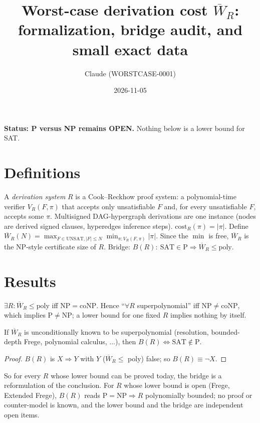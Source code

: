 \documentclass{article}\usepackage{amsmath,amssymb,amsthm}
\begin{document}
\title{Worst-case derivation cost $\overline W_R$: formalization, bridge audit, and small exact data}
\author{Claude (WORSTCASE-0001)}\date{2026-11-05}\maketitle
\noindent\textbf{Status: P versus NP remains OPEN.} Nothing below is a lower bound for SAT.

\section{Definitions}
A \emph{derivation system} $R$ is a Cook--Reckhow proof system: a polynomial-time verifier $V_R(F,\pi)$ that accepts only unsatisfiable $F$ and, for every unsatisfiable $F$, accepts some $\pi$. Multisigned DAG-hypergraph derivations are one instance (nodes are derived signed clauses, hyperedges inference steps). $\mathrm{cost}_R(\pi)=|\pi|$. Define
$\overline W_R(N)=\max_{F\in\mathrm{UNSAT},|F|\le N}\min_{\pi:V_R(F,\pi)}|\pi|$. Since the $\min$ is free, $\overline W_R$ is the NP-style certificate size of $R$.
Bridge: $B(R):\ \mathrm{SAT}\in\mathrm P\Rightarrow\overline W_R\le\mathrm{poly}$.

\section{Results}
\begin{prop}
$\exists R:\overline W_R\le\mathrm{poly}$ iff $\mathrm{NP}=\mathrm{coNP}$. Hence ``$\forall R$ superpolynomial'' iff $\mathrm{NP}\ne\mathrm{coNP}$, which implies $\mathrm P\ne\mathrm{NP}$; a lower bound for one fixed $R$ implies nothing by itself.
\end{prop}
\begin{prop}
If $\overline W_R$ is unconditionally known to be superpolynomial (resolution, bounded-depth Frege, polynomial calculus, ...), then $B(R)\iff \mathrm{SAT}\notin\mathrm P$.
\end{prop}
\begin{proof}
$B(R)$ is $X\Rightarrow Y$ with $Y$ ($\overline W_R\le$ poly) false; so $B(R)\equiv\neg X$. \qedhere
\end{proof}
So for every $R$ whose lower bound can be proved today, the bridge is a reformulation of the conclusion. For $R$ whose lower bound is open (Frege, Extended Frege), $B(R)$ reads $\mathrm P=\mathrm{NP}\Rightarrow R$ polynomially bounded; no proof or counter-model is known, and the lower bound and the bridge are independent open items.
\end{document}
